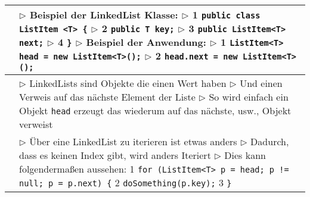 	\begin{table}[H]
	\label{LinkedList}
	\begin{tabular}{ | p{4cm} p{13.5cm} | }
	

	\hline
	\makecell[l]{Beispiel: Prinziep} & 
	\makecell[l]
	{
	$\rhd$ Beispiel der LinkedList Klasse: \\
	$\rhd$ \hspace{0.5cm}  1 \hspace{0.4cm} \texttt{public class ListItem <T> \{} \\
	$\rhd$ \hspace{0.5cm}  2 \hspace{0.6cm} \texttt{public T key;} \\
	$\rhd$ \hspace{0.5cm}  3 \hspace{0.6cm} \texttt{public ListItem<T> next;} \\
	$\rhd$ \hspace{0.5cm}  4 \hspace{0.4cm} \texttt{\}} \\
	$\rhd$ Beispiel der Anwendung: \\
	$\rhd$ \hspace{0.5cm}  1 \hspace{0.4cm} \texttt{ListItem<T> head = new ListItem<T>();} \\
	$\rhd$ \hspace{0.5cm}  2 \hspace{0.4cm} \texttt{head.next = new ListItem<T>();} \\
	} 	\\ \hline
	

	\makecell[l]{Prinziep} & 
	\makecell[l]
	{
	$\rhd$ LinkedLists sind Objekte die einen Wert haben \\	
	$\rhd$ Und einen Verweis auf das nächste Element der Liste \\
	$\rhd$ So wird einfach ein Objekt \texttt{head} erzeugt das wiederum \\
	\hspace{0.35cm} auf das nächste, usw., Objekt verweist \\
	} 	\\ \hline	


	\makecell[l]{Iteration} & 
	\makecell[l]
	{
	$\rhd$ Über eine LinkedList zu iterieren ist etwas anders \\
	$\rhd$ Dadurch, dass es keinen Index gibt, wird anders Iteriert \\
	$\rhd$ Dies kann folgenderma\ss en aussehen: \\
	\hspace{0.5cm}  1 \hspace{0.4cm} \texttt{for (ListItem<T> p = head; p != null; p = p.next) \{} \\
	\hspace{0.5cm}  2 \hspace{0.6cm} \texttt{doSomething(p.key);} \\
	\hspace{0.5cm}  3 \hspace{0.4cm} \texttt{\}} \\
	} 	\\ \hline



\end{tabular}
\end{table}
